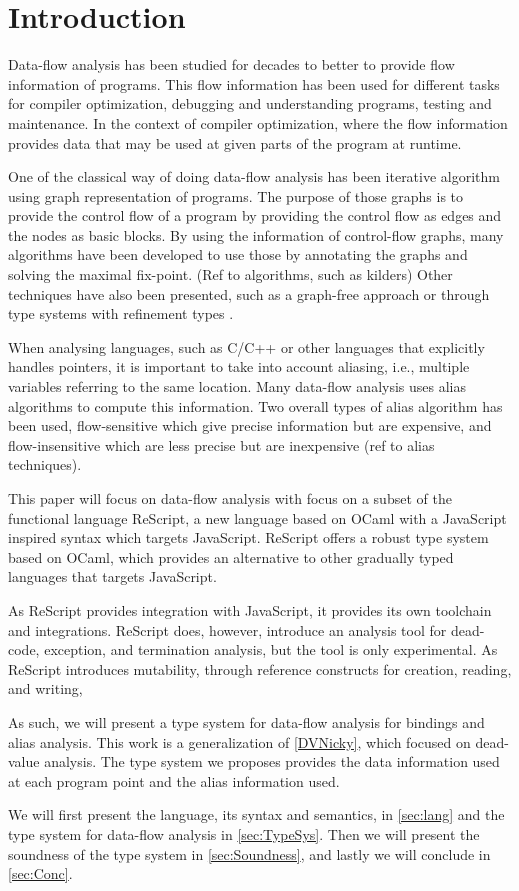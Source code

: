 \documentclass[../../master.tex]{subfiles}
\begin{document}
\section{Introduction}
Data-flow analysis has been studied for decades to better to provide flow information of programs.
This flow information has been used for different tasks for compiler optimization, debugging and understanding programs, testing and maintenance.
In the context of compiler optimization, where the flow information provides data that may be used at given parts of the program at runtime.

One of the classical way of doing data-flow analysis has been iterative algorithm using graph representation of programs.
The purpose of those graphs is to provide the control flow of a program by providing the control flow as edges and the nodes as basic blocks.
By using the information of control-flow graphs, many algorithms have been developed to use those by annotating the graphs and solving the maximal fix-point\cite{KildallGaryA1973Auat}. (Ref to algorithms, such as kilders)
Other techniques have also been presented, such as a graph-free approach \cite{HorspoolR.Niegel2002AGAt} or through type systems with refinement types \cite{PavlinovicZvonimir2021Dfrt}.

When analysing languages, such as C/C++ or other languages that explicitly handles pointers, it is important to take into account aliasing, i.e., multiple variables referring to the same location.
Many data-flow analysis uses alias algorithms to compute this information.
Two overall types of alias algorithm has been used, flow-sensitive which give precise information but are expensive, and flow-insensitive which are less precise but are inexpensive \cite{LiangDonglin1999Eaag}(ref to alias techniques).
\bigskip

This paper will focus on data-flow analysis with focus on a subset of the functional language ReScript, a new language based on OCaml with a JavaScript inspired syntax which targets JavaScript.
ReScript offers a robust type system based on OCaml, which provides an alternative to other gradually typed languages that targets JavaScript.\cite{rescript_rebrand}

As ReScript provides integration with JavaScript, it provides its own toolchain and integrations.
ReScript does, however, introduce an analysis tool for dead-code, exception, and termination analysis, but the tool is only experimental.\cite{reanalyze}
As ReScript introduces mutability, through reference constructs for creation, reading, and writing,

As such, we will present a type system for data-flow analysis for bindings and alias analysis.
This work is a generalization of \cref{DVNicky}, which focused on dead-value analysis.
The type system we proposes provides the data information used at each program point and the alias information used.
\bigskip

We will first present the language, its syntax and semantics, in \cref{sec:lang} and the type system for data-flow analysis in \cref{sec:TypeSys}.
Then we will present the soundness of the type system in \cref{sec:Soundness}, and lastly we will conclude in \cref{sec:Conc}.
\end{document}
